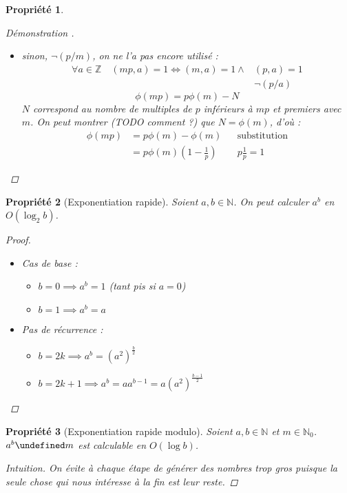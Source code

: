 \documentclass[11pt,twocolumn]{article}
\let\mod\undefined
\DeclareMathOperator{\mod}{mod}
\theoremstyle{plain}
\newtheorem{pr}{Propriété}
\newcommand{\esN}{\mathbb{N}} %
\newcommand{\esZ}{\mathbb{Z}} %
\newcommand{\dbi}{\Longleftrightarrow}
\newenvironment{cproof}[1]{\begin{proof}[Démonstration \cite{#1}]}{\end{proof}}
\begin{document}
\begin{pr}
\begin{cproof}{Buys}
\begin{itemize}
\[				\]
				Dans chaque ensemble de cette partition,
				$\phi(m)$ éléments sont inférieurs et
				premiers avec $mp$ : \[
					\phi(mp)=p\phi(m)
				\]
			\item sinon, $\lnot(p/m)$, on ne l'a pas encore utilisé :
				\begin{align*}
					\forall a \in \esZ \quad (mp,a)=1
					\dbi (m,a)=1 \land& (p,a)=1 \\
					& \lnot(p/a)
				\end{align*}
				\[
					\phi(mp)=p\phi(m)-N
				\]
				$N$ correspond au nombre de multiples de $p$
				inférieurs à $mp$ et premiers avec $m$.
				On peut montrer (TODO comment ?) que $N=\phi(m)$, d'où :
				\begin{align*}
					\phi(mp) &= p\phi(m) - \phi(m) && \text{substitution} \\
					&= p\phi(m)\left(1-\frac1p\right) && p\frac1p=1
				\end{align*}
		\end{itemize}
	\end{cproof}
\end{pr}
\begin{pr}[Exponentiation rapide]\label{pr:fastexp}
	Soient $a,b \in \esN$.
	On peut calculer $a^b$ en $O(\log_2b)$.
	\begin{proof} ~
		\begin{itemize}
			\item Cas de base :
				\begin{itemize}
					\item $b=0 \implies a^b = 1$ (tant pis si $a=0$)
					\item $b=1 \implies a^b = a$
				\end{itemize}
			\item Pas de récurrence :
				\begin{itemize}
					\item $b=2k \implies a^b =
						\left(a^2\right)^\frac{b}2$
					\item $b=2k+1 \implies a^b =
						aa^{b-1}=a\left(a^2\right)^{\frac{b-1}2}$
				\end{itemize}
		\end{itemize}
	\end{proof}
\end{pr}
\begin{pr}[Exponentiation rapide modulo]
	Soient $a,b \in \esN$ et $m \in \esN_0$.
	$a^b \mod m$ est calculable en $O(\log b)$.
	\begin{proof}[Intuition]
		On évite à chaque étape de générer des nombres trop gros puisque
		la seule chose qui nous intéresse à la fin est leur reste.
	\end{proof}
\end{pr}
\end{document}
